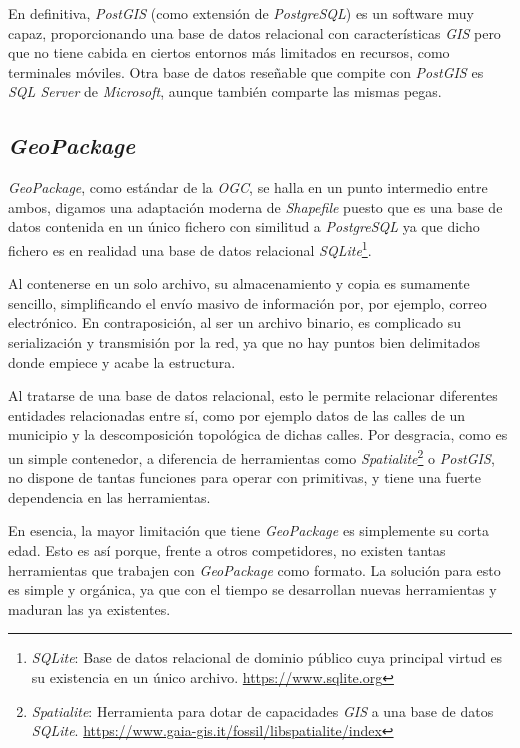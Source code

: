 	En definitiva, \textit{PostGIS} (como extensión de \textit{PostgreSQL}) es un software muy capaz, proporcionando una base de datos relacional con características \textit{GIS} pero que no tiene cabida en ciertos entornos más limitados en recursos, como terminales móviles. Otra base de datos reseñable que compite con \textit{PostGIS} es \textit{SQL Server} de \textit{Microsoft}, aunque también comparte las mismas pegas.

\subsection{\textit{GeoPackage}}
	\textit{GeoPackage}, como estándar de la \textit{OGC}, se halla en un punto intermedio entre ambos, digamos una adaptación moderna de \textit{Shapefile} puesto que es una base de datos contenida en un único fichero con similitud a \textit{PostgreSQL} ya que dicho fichero es en realidad una base de datos relacional \textit{SQLite}\footnote{\textit{SQLite}: Base de datos relacional de dominio público cuya principal virtud es su existencia en un único archivo. \url{https://www.sqlite.org}}.
	
	Al contenerse en un solo archivo, su almacenamiento y copia es sumamente sencillo, simplificando el envío masivo de información por, por ejemplo, correo electrónico. En contraposición, al ser un archivo binario, es complicado su serialización y transmisión por la red, ya que no hay puntos bien delimitados donde empiece y acabe la estructura.
	
	Al tratarse de una base de datos relacional, esto le permite relacionar diferentes entidades relacionadas entre sí, como por ejemplo datos de las calles de un municipio y la descomposición topológica de dichas calles. Por desgracia, como es un simple contenedor, a diferencia de herramientas como \textit{Spatialite}\footnote{\textit{Spatialite}: Herramienta para dotar de capacidades \textit{GIS} a una base de datos \textit{SQLite}. \url{https://www.gaia-gis.it/fossil/libspatialite/index}} o \textit{PostGIS}, no dispone de tantas funciones para operar con primitivas, y tiene una fuerte dependencia en las herramientas.
	
	En esencia, la mayor limitación que tiene \textit{GeoPackage} es simplemente su corta edad. Esto es así porque, frente a otros competidores, no existen tantas herramientas que trabajen con \textit{GeoPackage} como formato. La solución para esto es simple y orgánica, ya que con el tiempo se desarrollan nuevas herramientas y maduran las ya existentes.
	
	 